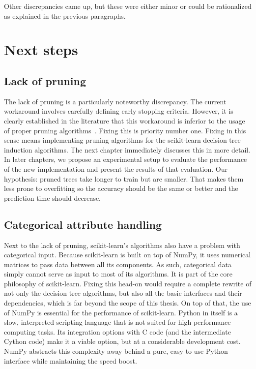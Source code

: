 Other discrepancies came up, but these were either minor or could be rationalized as explained in the previous paragraphs.

\section{Next steps}

\subsection{Lack of pruning}
The lack of pruning is a particularly noteworthy discrepancy. The current workaround involves carefully defining early stopping criteria. However, it is clearly established in the literature that this workaround is inferior to the usage of proper pruning algorithms~\cite{cart, c45}. Fixing this is priority number one. Fixing in this sense means implementing pruning algorithms for the scikit-learn decision tree induction algorithms. The next chapter immediately discusses this in more detail. In later chapters, we propose an experimental setup to evaluate the performance of the new implementation and present the results of that evaluation. Our hypothesis: pruned trees take longer to train but are smaller. That makes them less prone to overfitting so the accuracy should be the same or better and the prediction time should decrease.

\subsection{Categorical attribute handling}
Next to the lack of pruning, scikit-learn's algorithms also have a problem with categorical input. Because scikit-learn is built on top of NumPy, it uses numerical matrices to pass data between all its components. As such, categorical data simply cannot serve as input to most of its algorithms. It is part of the core philosophy of scikit-learn. Fixing this head-on would require a complete rewrite of not only the decision tree algorithms, but also all the basic interfaces and their dependencies, which is far beyond the scope of this thesis. On top of that, the use of NumPy is essential for the performance of scikit-learn. Python in itself is a slow, interpreted scripting language that is not suited for high performance computing tasks. Its integration options with C code (and the intermediate Cython code) make it a viable option, but at a considerable development cost. NumPy abstracts this complexity away behind a pure, easy to use Python interface while maintaining the speed boost.

